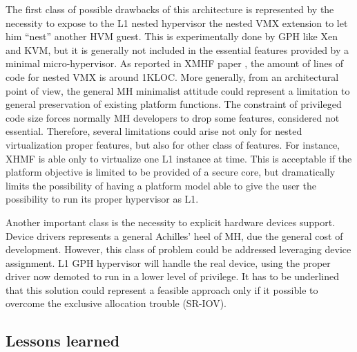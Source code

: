 \documentclass{sig-alternate}
\begin{document}
The first class of possible drawbacks of this architecture is represented by the necessity to expose to the L1 nested hypervisor the nested VMX extension to let him ``nest'' another HVM guest. This is experimentally done by GPH like Xen and KVM, but it is generally not included in the essential features provided by a minimal micro-hypervisor. As reported in XMHF paper \cite{xmhf}, the amount of lines of code for nested VMX is around 1KLOC. 
More generally, from an architectural point of view, the general MH minimalist attitude could represent a limitation to general preservation of existing platform functions. The constraint of privileged code size forces normally MH developers to drop some features, considered not essential. Therefore, several limitations could arise not only for nested virtualization proper features, but also for other class of features. For instance, XHMF is able only to virtualize one L1 instance at time. This is acceptable if the platform objective is limited to be provided of a secure core, but dramatically limits the possibility of having a platform model able to give the user the possibility to run its proper hypervisor as L1.

Another important class is the necessity to explicit hardware devices support. Device drivers represents a general Achilles' heel of MH, due the general cost of development. However, this class of problem could be addressed leveraging device assignment. L1 GPH hypervisor will handle the real device, using the proper driver now demoted to run in a lower level of privilege. It has to be underlined that this solution could represent a feasible approach only if it possible to overcome the exclusive allocation trouble (SR-IOV).
 
\subsection{Lessons learned}
\end{document}
